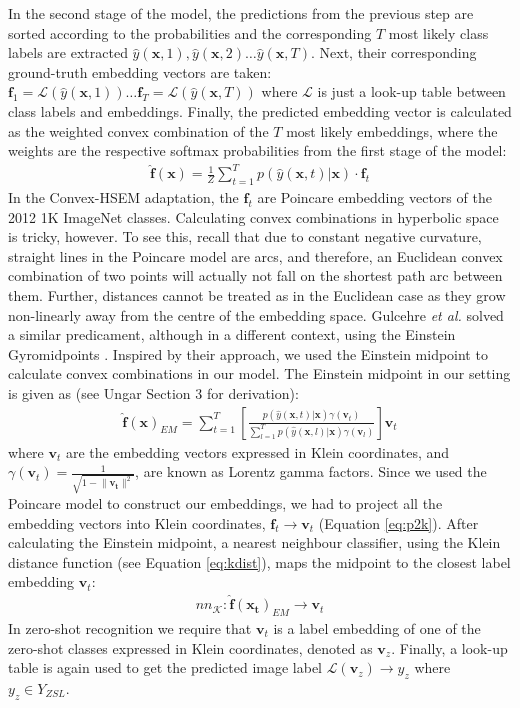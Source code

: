 \documentclass[12pt]{report}
\begin{document}
In the second stage of the model, the predictions from the previous step are sorted according to the probabilities and the corresponding $T$ most likely class labels are extracted $\hat{y}(\mathbf{x}, 1),\hat{y}(\mathbf{x}, 2) \dots \hat{y}(\mathbf{x}, T)$. Next, their corresponding ground-truth embedding vectors are taken: $\mathbf{f}_1 = \mathcal{L}(\hat{y}(\mathbf{x}, 1)) \dots \mathbf{f}_T = \mathcal{L}(\hat{y}(\mathbf{x}, T))$ where $\mathcal{L}$ is just a look-up table between class labels and embeddings. Finally, the predicted embedding vector is calculated as the weighted convex combination of the $T$ most likely embeddings, where the weights are the respective softmax probabilities from the first stage of the model:
\begin{align}
  \mathbf{\hat{f}(\mathbf{x})} = \frac{1}{Z}\sum_{t=1}^T p(\hat{y}(\mathbf{x}, t)| \mathbf{x}) \cdot \mathbf{f}_t
\end{align}
In the Convex-HSEM adaptation, the $\mathbf{f}_t$ are Poincare embedding vectors of the 2012 1K ImageNet classes. Calculating convex combinations in hyperbolic space is tricky, however. To see this, recall that due to constant negative curvature, straight lines in the Poincare model are arcs, and therefore, an Euclidean convex combination of two points will actually not fall on the shortest path arc between them. Further, distances cannot be treated as in the Euclidean case as they grow non-linearly away from the centre of the embedding space. Gulcehre \textit{et al.} \cite{Gulcehre2018} solved a similar predicament, although in a different context, using the Einstein Gyromidpoints \cite{Ungar2005, Ungar2009}. Inspired by their approach, we used the Einstein midpoint to calculate convex combinations in our model. The Einstein midpoint in our setting is given as (see Ungar \cite{Ungar2009} Section 3 for derivation):
\begin{align*}
  \mathbf{\hat{f}(\mathbf{x})}_{EM} = \sum_{t=1}^T \left[\frac{p(\hat{y}(\mathbf{x}, t)|\mathbf{x})\gamma(\mathbf{v}_t)}{\sum_{l=1}^T p(\hat{y}(\mathbf{x}, l)|\mathbf{x})\gamma(\mathbf{v}_l)}\right]\mathbf{v}_t
\end{align*}
where $\mathbf{v}_t$ are the embedding vectors expressed in Klein coordinates, and $\gamma(\mathbf{v}_t)=\frac{1}{\sqrt{1 - \lVert\mathbf{v_t}\rVert^2}}$, are known as Lorentz gamma factors. Since we used the Poincare model to construct our embeddings, we had to project all the embedding vectors into Klein coordinates, $\mathbf{f}_t \rightarrow \mathbf{v}_t$ (Equation \ref{eq:p2k}). After calculating the Einstein midpoint, a nearest neighbour classifier, using the Klein distance function (see Equation \ref{eq:kdist}), maps the midpoint to the closest label embedding $\mathbf{v}_t$:
\begin{align*}
  nn_{\mathcal{K}}: \mathbf{\hat{f}}(\mathbf{x_t})_{EM} \rightarrow \mathbf{v}_t
\end{align*}
In zero-shot recognition we require that $\mathbf{v}_t$ is a label embedding of one of the zero-shot classes expressed in Klein coordinates, denoted as $\mathbf{v}_z$. Finally, a look-up table is again used to get the predicted image label $\mathcal{L}(\mathbf{v}_z) \rightarrow y_z$ where $y_z \in Y_{ZSL}$.
\end{document}
